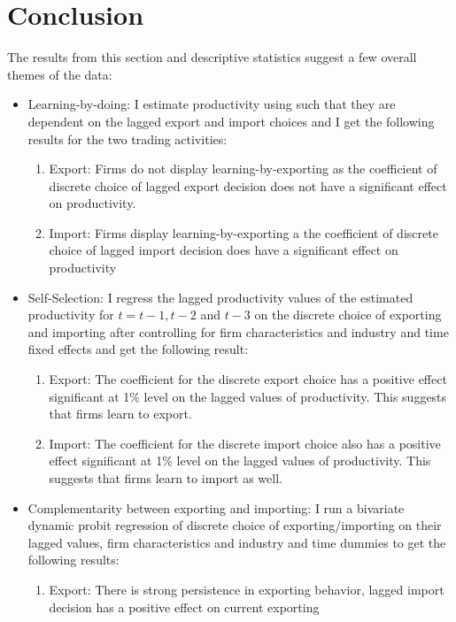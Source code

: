 \documentclass[11pt]{article}
\begin{document}
\section{Conclusion}

The results from this section and descriptive statistics suggest a few
overall themes of the data: 
\begin{itemize}
\item Learning-by-doing: I estimate productivity using
  \textcite{levinsohn2003estimating} such that they are dependent on the
  lagged export and import choices and I get the following results for
  the two trading activities:
\begin{enumerate}
\item Export: Firms do not display learning-by-exporting as the
  coefficient of discrete choice of lagged export decision does not
  have a significant effect on productivity. 
\item Import: Firms display learning-by-exporting a the
  coefficient of discrete choice of lagged import decision does
  have a significant effect on productivity 
\end{enumerate}
\item Self-Selection: I regress the lagged productivity values of the
  estimated productivity for $t= t-1,t-2$ and $t-3$ on the discrete choice
  of exporting and importing after controlling for firm
  characteristics and industry and time fixed effects and get the
  following result:
\begin{enumerate}
\item Export: The coefficient for the discrete export choice has a
  positive effect significant at 1\% level on the lagged values of
  productivity. This suggests that firms learn to export.  
\item Import:  The coefficient for the discrete import choice also has a
  positive effect significant at 1\% level on the lagged values of
  productivity. This suggests that firms learn to import as well. 
\end{enumerate} 
\item Complementarity between exporting and importing: I run a
  bivariate dynamic probit regression of discrete choice of
  exporting/importing on their lagged values, firm characteristics and
  industry and time dummies to get the following results:
\begin{enumerate}
\item Export: There is strong persistence in exporting behavior,
  lagged import decision has a positive effect on current exporting

\end{enumerate}
\end{itemize}
\end{document}

